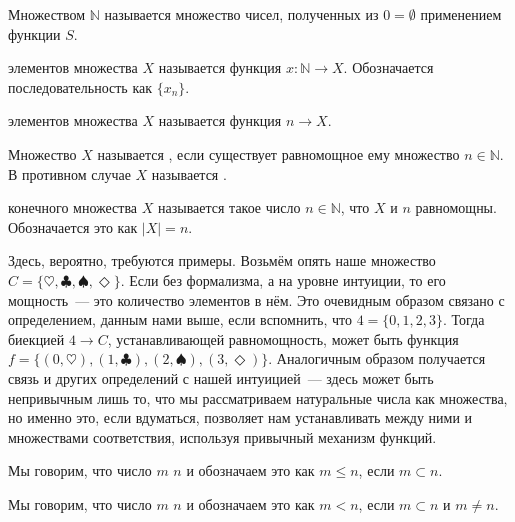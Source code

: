 \begin{definition}
Множеством  $\mathbb{N}$ называется множество чисел, полученных из $0=\emptyset$ применением функции $S$.
\end{definition}

\begin{definition}
 элементов множества $X$ называется функция $x:\mathbb{N}\to X$. Обозначается последовательность как $\{x_n\}$.
\end{definition}

\begin{definition}
 элементов множества $X$ называется функция $n \to X$.
\end{definition}

\begin{definition}
Множество $X$ называется , если существует равномощное ему множество $n\in\mathbb{N}$. В противном случае $X$ называется .
\end{definition}

\begin{definition}
 конечного множества $X$ называется такое число $n\in \mathbb{N}$, что $X$ и $n$ равномощны. Обозначается это как $|X| = n$.
\end{definition}

Здесь, вероятно, требуются примеры. Возьмём опять наше множество $C=\{\heartsuit, \clubsuit, \spadesuit, \Diamond\}$. Если без формализма, а на уровне интуиции, то его мощность~--- это количество элементов в нём. Это очевидным образом связано с определением, данным нами выше, если вспомнить, что $4 = \{0, 1, 2, 3\}$. Тогда биекцией $4\to C$, устанавливающей равномощность, может быть функция $f = \{(0, \heartsuit), (1, \clubsuit), (2, \spadesuit), (3, \Diamond)\}$. Аналогичным образом получается связь и других определений с нашей интуицией~--- здесь может быть непривычным лишь то, что мы рассматриваем натуральные числа как множества, но именно это, если вдуматься, позволяет нам устанавливать между ними и множествами соответствия, используя привычный механизм функций.

\begin{definition}
Мы говорим, что число $m$  $n$ и обозначаем это как $m\le n$, если $m\subset n$.
\end{definition}

\begin{definition}
Мы говорим, что число $m$  $n$ и обозначаем это как $m<n$, если $m\subset n$ и $m \not= n$.
\end{definition}

